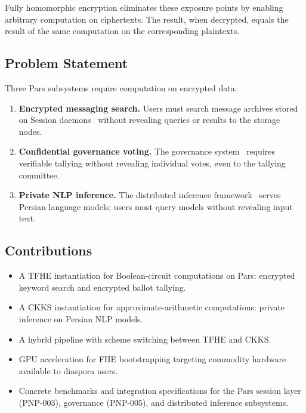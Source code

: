 \documentclass[11pt,a4paper]{article}
\begin{document}
Fully homomorphic encryption eliminates these exposure points by enabling
arbitrary computation on ciphertexts.  The result, when decrypted, equals
the result of the same computation on the corresponding plaintexts.

\subsection{Problem Statement}

Three Pars subsystems require computation on encrypted data:

\begin{enumerate}
    \item \textbf{Encrypted messaging search.}  Users must search
    message archives stored on Session daemons~\cite{pnp003} without
    revealing queries or results to the storage nodes.
    \item \textbf{Confidential governance voting.}  The governance
    system~\cite{pnp005} requires verifiable tallying without revealing
    individual votes, even to the tallying committee.
    \item \textbf{Private NLP inference.}  The distributed inference
    framework~\cite{pars_distributed_inference} serves Persian language
    models; users must query models without revealing input text.
\end{enumerate}

\subsection{Contributions}

\begin{itemize}
    \item A TFHE instantiation for Boolean-circuit computations on Pars:
    encrypted keyword search and encrypted ballot tallying.
    \item A CKKS instantiation for approximate-arithmetic computations:
    private inference on Persian NLP models.
    \item A hybrid pipeline with scheme switching between TFHE and CKKS.
    \item GPU acceleration for FHE bootstrapping targeting commodity
    hardware available to diaspora users.
    \item Concrete benchmarks and integration specifications for the Pars
    session layer (PNP-003), governance (PNP-005), and distributed
    inference subsystems.
\end{itemize}
\end{document}
